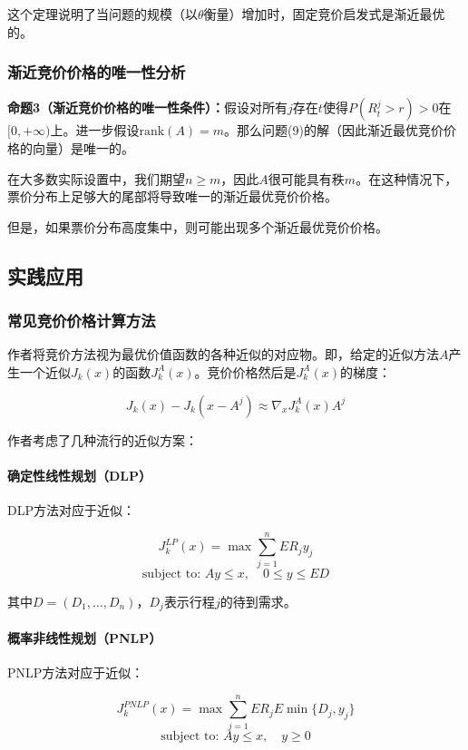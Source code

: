 \documentclass[
  10pt
]{article}
\begin{document}
这个定理说明了当问题的规模（以$\theta$衡量）增加时，固定竞价启发式是渐近最优的。

\subsubsection{渐近竞价价格的唯一性分析}

\begin{propositionbox}
\textbf{命题3（渐近竞价价格的唯一性条件）：}假设对所有$j$存在$t$使得$P(R_t^j > r) > 0$在$[0, +\infty)$上。进一步假设$\text{rank}(A) = m$。那么问题(9)的解（因此渐近最优竞价价格的向量）是唯一的。
\end{propositionbox}

在大多数实际设置中，我们期望$n \geq m$，因此$A$很可能具有秩$m$。在这种情况下，票价分布上足够大的尾部将导致唯一的渐近最优竞价价格。

但是，如果票价分布高度集中，则可能出现多个渐近最优竞价价格。

\subsection{实践应用}

\subsubsection{常见竞价价格计算方法}

作者将竞价方法视为最优价值函数的各种近似的对应物。即，给定的近似方法$A$产生一个近似$J_k(x)$的函数$J_k^A(x)$。竞价价格然后是$J_k^A(x)$的梯度：

$$J_k(x) - J_k(x - A^j) \approx \nabla_x J_k^A(x) A^j$$

作者考虑了几种流行的近似方案：

\paragraph{确定性线性规划（DLP）}
DLP方法对应于近似：

$$J_k^{LP}(x) = \max \sum_{j=1}^n E R_j y_j$$
$$\text{subject to: } A y \leq x, \quad 0 \leq y \leq E D$$

其中$D = (D_1, \ldots, D_n)$，$D_j$表示行程$j$的待到需求。

\paragraph{概率非线性规划（PNLP）}
PNLP方法对应于近似：

$$J_k^{PNLP}(x) = \max \sum_{j=1}^n E R_j E \min\{D_j, y_j\}$$
$$\text{subject to: } A y \leq x, \quad y \geq 0$$
\end{document}
